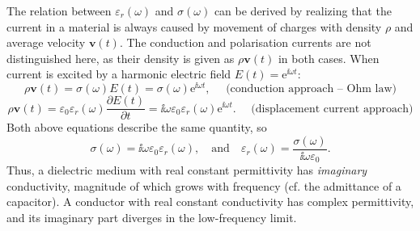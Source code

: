 The relation between $\varepsilon_r(\omega)$ and $\sigma(\omega)$
 can be derived by realizing that the current in a material is always caused by movement of charges with density $\rho$ and average velocity $\mathbf{v}(t)$. The conduction and polarisation currents are not distinguished here, as their density is given as $\rho \mathbf{v}(t)$ in both cases. When current is excited by a harmonic electric field $E(t) = \mathrm{e}^{\ii\omega t}$: %
\begin{equation} \rho \mathbf{v}(t) = \sigma(\omega) E(t) = \sigma(\omega) \mathrm{e}^{\ii\omega t}, \quad\text{ (conduction approach -- Ohm law)} \label{eq_rho_n1}\end{equation}
\begin{equation} \rho \mathbf{v}(t) = \varepsilon_0 \varepsilon_r(\omega) \frac{\partial E(t)}{\partial t} = \ii \omega \varepsilon_0 \varepsilon_r(\omega) \mathrm{e}^{\ii\omega t} . \quad\text{ (displacement current approach)} \label{eq_rho_n2}\end{equation}
Both above equations describe the same quantity, so
\begin{equation} \sigma(\omega) = \ii \omega \varepsilon_0 \varepsilon_r(\omega), \quad  \text{and} \quad  \varepsilon_r(\omega)  = \frac{\sigma(\omega)}{\ii \omega \varepsilon_0}. \label{eq_drude_sigma}\end{equation}
Thus, a dielectric medium with real constant permittivity has \textit{imaginary} conductivity, magnitude of which grows with frequency (cf. the admittance of a capacitor). A conductor with real constant conductivity has complex permittivity, and its imaginary part diverges in the low-frequency limit. 

